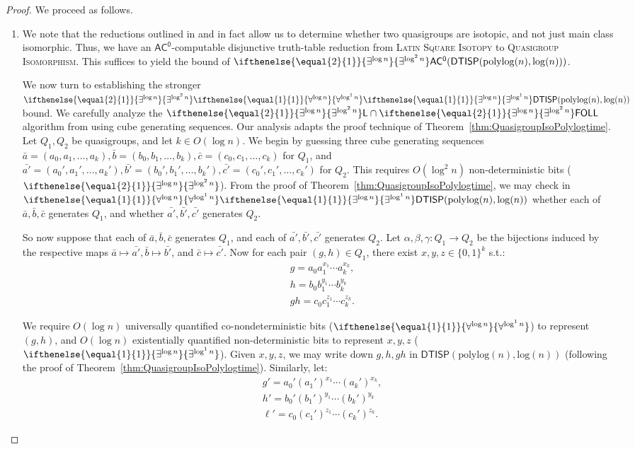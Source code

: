 \documentclass{article}
\newcommand{\algprobm}[1]{\textsc{#1}\xspace}
\newcommand{\betacc}[1]{\ifthenelse{\equal{#1}{1}}{\exists^{\log n}}{\exists^{\log^{#1}n}}} %
\newcommand{\alphacc}[1]{\ifthenelse{\equal{#1}{1}}{\forall^{\log n}}{\forall^{\log^{#1}n}}} %
\newcommand*{\ComplexityClass}[1]{\ensuremath{\mathsf{#1}}\xspace}
\newcommand{\DTISP}{\ComplexityClass{DTISP}}
\newcommand{\DTISPpll}{\ensuremath{\DTISP(\mathrm{polylog}(n),\mathrm{log}(n))}\xspace}
\newcommand*{\LogSpace}{\ComplexityClass{L}}
\newcommand{\ACz}{\ComplexityClass{AC^0}}
\newcommand{\FOLL}{\ComplexityClass{FOLL}}
\begin{document}
\begin{proof}
We proceed as follows.
\begin{enumerate}[label=(\alph*)]
\item We note that the reductions outlined in \cite[Theorem~2]{MillerTarjan} and \cite[Remark~1.6]{LevetLatinSquares} in fact allow us to determine whether two quasigroups are isotopic, and not just main class isomorphic. Thus, we have an $\ACz$-computable disjunctive truth-table reduction from \algprobm{Latin Square Isotopy} to \algprobm{Quasigroup Isomorphism}. This suffices to yield the bound of $\betacc{2}\ACz(\DTISPpll)$. 

We now turn to establishing the stronger $\betacc{2}\alphacc{1}\betacc{1}\DTISPpll$ bound. We carefully analyze the $\betacc{2}\LogSpace \cap \betacc{2}\FOLL$ algorithm from \cite[Section~3]{LevetLatinSquares} using cube generating sequences. Our analysis adapts the proof technique of Theorem~\ref{thm:QuasigroupIsoPolylogtime}. Let $Q_1, Q_2$ be quasigroups, and let $k \in O(\log n)$. We begin by guessing three cube generating sequences $\bar{a} = (a_0, a_1, \ldots, a_k), \bar{b} = (b_0, b_1, \ldots, b_k), \bar{c} = (c_0, c_1, \ldots, c_k)$ for $Q_1$, and $\bar{a'} = (a_{0}', a_{1}', \ldots, a_{k}'), \bar{b'} = (b_{0}', b_{1}', \ldots, b_{k}'),\bar{c'} = (c_{0}', c_{1}', \ldots, c_{k}')$ for $Q_2$. This requires $O(\log^2 n)$ non-deterministic bits ($\betacc{2}$). From the proof of Theorem~\ref{thm:QuasigroupIsoPolylogtime}, we may check in $\alphacc{1}\betacc{1}\DTISPpll$ whether each of $\bar{a}, \bar{b}, \bar{c}$ generates $Q_1$, and whether $\bar{a'}, \bar{b'}, \bar{c'}$ generates $Q_2$. 

So now suppose that each of $\bar{a}, \bar{b}, \bar{c}$ generates $Q_1$, and each of $\bar{a'}, \bar{b'}, \bar{c'}$ generates $Q_2$. Let $\alpha, \beta, \gamma : Q_1 \to Q_2$ be the bijections induced by the respective maps $\bar{a} \mapsto \bar{a'}, \bar{b} \mapsto \bar{b'}$, and $\bar{c} \mapsto \bar{c'}$. Now for each pair $(g, h) \in Q_1$, there exist $x, y, z \in \{0,1\}^{k}$ s.t.:
\begin{align*}
&g = a_{0}a_{1}^{x_{1}} \cdots a_{k}^{x_{k}}, \\
&h = b_{0}b_{1}^{y_{1}} \cdots b_{k}^{y_{k}} \\
&gh = c_{0}c_{1}^{z_{1}} \cdots c_{k}^{z_{k}}.
\end{align*}

We require $O(\log n)$ universally quantified co-nondeterministic bits ($\alphacc{1}$) to represent $(g, h)$, and $O(\log n)$ existentially quantified non-deterministic bits to represent $x, y, z$ ($\betacc{1}$). Given $x, y, z$, we may write down $g, h, gh$ in $\DTISPpll$ (following the proof of Theorem~\ref{thm:QuasigroupIsoPolylogtime}). Similarly, let:
\begin{align*}
&g' = a_{0}'(a_{1}')^{x_{1}} \cdots (a_{k}')^{x_{k}}, \\
&h' = b_{0}'(b_{1}')^{y_{1}} \cdots (b_{k}')^{y_{k}} \\
&\ell' = c_{0}(c_{1}')^{z_{1}} \cdots (c_{k}')^{z_{k}}.
\end{align*}


\end{enumerate}
\end{proof}
\end{document}
